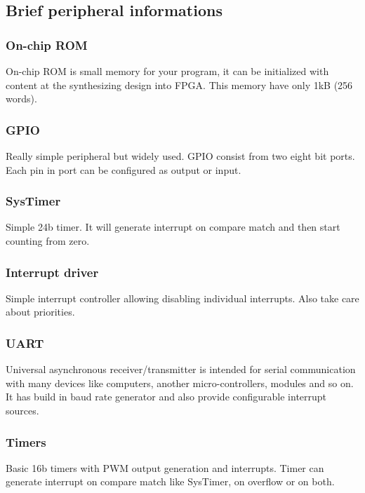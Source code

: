 \subsection{Brief peripheral informations}

\subsubsection{On-chip ROM}

On-chip ROM is small memory for your program, it can be initialized with content
 at the synthesizing design into FPGA. This memory have only 1kB (256 words).

\subsubsection{GPIO}

Really simple peripheral but widely used. GPIO consist from two eight bit ports.
 Each pin in port can be configured as output or input.

\subsubsection{SysTimer}

Simple 24b timer. It will generate interrupt on compare match and then start
counting from zero.

\subsubsection{Interrupt driver}

Simple interrupt controller allowing disabling individual interrupts. Also take
care about priorities.

\subsubsection{UART}

Universal asynchronous receiver/transmitter is intended for serial communication
with many devices like computers, another micro-controllers, modules and so on.
It has build in baud rate generator and also provide configurable interrupt sources.

\subsubsection{Timers}

Basic 16b timers with PWM output generation and interrupts. Timer can generate
interrupt on compare match like SysTimer, on overflow or on both.

